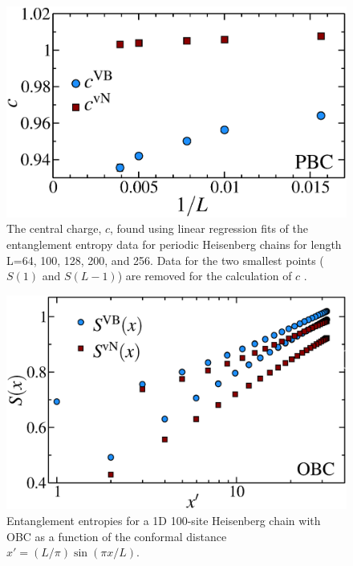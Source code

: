 \begin{figure} {
\includegraphics[width=6in]{./figures/paper1/figure1/thesis_c1.eps} 
	\centering
	\caption[1D Results for VB EE and von Neumann EE]{
	The central charge, $c$, found using linear regression fits of the entanglement entropy data 	for periodic Heisenberg chains for length L=64, 100, 128, 200, and 256.  Data for the two smallest 	points ($S(1)$ and $S(L-1)$) are removed for the calculation of $c$ .
	\label{c1}}
} 
\end{figure}


\begin{figure} {
	\includegraphics[width=5.5in]{./figures/paper1/figure1/thesis_obc.eps} 
	\centering
	\caption[1D OBC Results for VB EE and von Neumann EE]{
	Entanglement entropies for a 1D 100-site Heisenberg chain with OBC as a function of the conformal distance $x'  = (L/\pi)\sin (\pi x/L)$.
	\label{1dOBC}}}
\end{figure}

